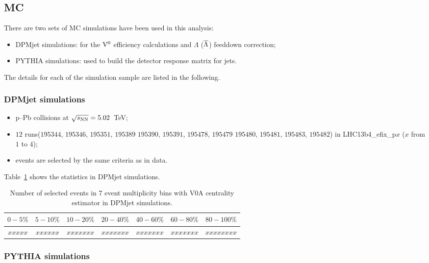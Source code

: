 \subsection{MC}

There are two sets of MC simulations have been used in this analysis:
\begin{itemize}
\item DPMjet simulations: for the ${\rm V}^{0}$ efficiency calculations
      and $\Lambda$ ($\overline{\Lambda}$) feeddown correction;
\item PYTHIA simulations: used to build the detector response matrix for jets.
\end{itemize}
The details for each of the simulation sample are listed in the following.

\subsubsection{DPMjet simulations}

\begin{itemize}
\item  p--Pb collisions at $\sqrt{s_{\rm NN}}=5.02$~TeV;
\item $12$ runs($195344$, $195346$, $195351$, $195389$
                $195390$, $195391$, $195478$, $195479$
                $195480$, $195481$, $195483$, $195482$)
      in LHC13b4\_efix\_p$x$ ($x$ from $1$ to $4$);
\item events are selected by the same criteria as in data.
\end{itemize}
Table~\ref{tab:c02NumSelEvMC} shows the statistics in DPMjet simulations.

\begin{table}[htdp]
\begin{center}
\begin{tabular}{|c|c|c|c|c|c|c|}
\hline
$0-5\%$ & $5-10\%$ & $10-20\%$ & $20-40\%$ &
                     $40-60\%$ & $60-80\%$ & $80-100\%$ \\
\hline
$xxxxx$ & $xxxxxx$ & $xxxxxxx$ & $xxxxxxx$ &
                     $xxxxxxx$ & $xxxxxxx$ & $xxxxxxxx$ \\
\hline
\end{tabular}
\end{center}
\caption{Number of selected events in $7$ event multiplicity bins with
         V0A centrality estimator in DPMjet simulations.}
\label{tab:c02NumSelEvMC}
\end{table}

\subsubsection{PYTHIA simulations}\label{sec:03PySampleMC}

